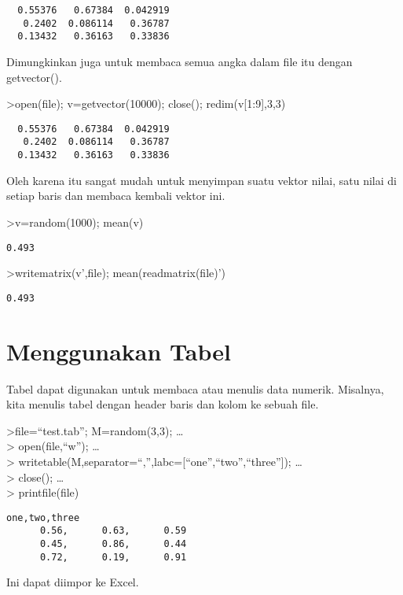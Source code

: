 \documentclass[
]{book}
\begin{document}
\begin{verbatim}
  0.55376   0.67384  0.042919 
   0.2402  0.086114   0.36787 
  0.13432   0.36163   0.33836 
\end{verbatim}

Dimungkinkan juga untuk membaca semua angka dalam file itu dengan getvector().

\textgreater open(file); v=getvector(10000); close(); redim(v{[}1:9{]},3,3)

\begin{verbatim}
  0.55376   0.67384  0.042919 
   0.2402  0.086114   0.36787 
  0.13432   0.36163   0.33836 
\end{verbatim}

Oleh karena itu sangat mudah untuk menyimpan suatu vektor nilai, satu nilai di setiap baris dan membaca kembali vektor ini.

\textgreater v=random(1000); mean(v)

\begin{verbatim}
0.493
\end{verbatim}

\textgreater writematrix(v',file); mean(readmatrix(file)')

\begin{verbatim}
0.493
\end{verbatim}

\chapter{Menggunakan Tabel}\label{menggunakan-tabel}

Tabel dapat digunakan untuk membaca atau menulis data numerik. Misalnya, kita menulis tabel dengan header baris dan kolom ke sebuah file.

\textgreater file=``test.tab''; M=random(3,3); \ldots{}\\
\textgreater{} open(file,``w''); \ldots{}\\
\textgreater{} writetable(M,separator=``,'',labc={[}``one'',``two'',``three''{]}); \ldots{}\\
\textgreater{} close(); \ldots{}\\
\textgreater{} printfile(file)

\begin{verbatim}
one,two,three
      0.56,      0.63,      0.59
      0.45,      0.86,      0.44
      0.72,      0.19,      0.91
\end{verbatim}

Ini dapat diimpor ke Excel.
\end{document}
